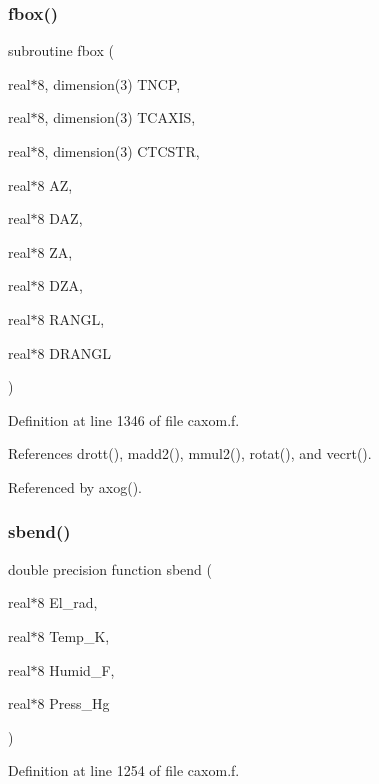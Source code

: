 \subsubsection{\texorpdfstring{fbox()}{fbox()}}
{\footnotesize\ttfamily subroutine fbox (\begin{DoxyParamCaption}\item[{real$\ast$8, dimension(3)}]{T\+N\+CP,  }\item[{real$\ast$8, dimension(3)}]{T\+C\+A\+X\+IS,  }\item[{real$\ast$8, dimension(3)}]{C\+T\+C\+S\+TR,  }\item[{real$\ast$8}]{AZ,  }\item[{real$\ast$8}]{D\+AZ,  }\item[{real$\ast$8}]{ZA,  }\item[{real$\ast$8}]{D\+ZA,  }\item[{real$\ast$8}]{R\+A\+N\+GL,  }\item[{real$\ast$8}]{D\+R\+A\+N\+GL }\end{DoxyParamCaption})}



Definition at line 1346 of file caxom.\+f.



References drott(), madd2(), mmul2(), rotat(), and vecrt().



Referenced by axog().

\mbox{\label{caxom_8f_ab109bff9ead327f220a0b0dc244a23d1}} 
\subsubsection{\texorpdfstring{sbend()}{sbend()}}
{\footnotesize\ttfamily double precision function sbend (\begin{DoxyParamCaption}\item[{real$\ast$8}]{El\+\_\+rad,  }\item[{real$\ast$8}]{Temp\+\_\+K,  }\item[{real$\ast$8}]{Humid\+\_\+F,  }\item[{real$\ast$8}]{Press\+\_\+\+Hg }\end{DoxyParamCaption})}



Definition at line 1254 of file caxom.\+f.

